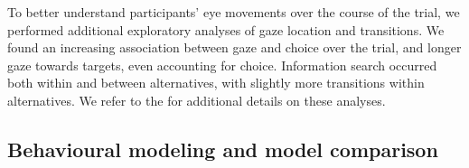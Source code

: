 \documentclass[11pt, a4paper]{article}
\begin{document}
To better understand participants' eye movements over the course of the trial, we performed additional exploratory analyses of gaze location and transitions. We found an increasing association between gaze and choice over the trial, and longer gaze towards targets, even accounting for choice. Information search occurred both within and between alternatives, with slightly more transitions within alternatives. We refer to the  for additional details on these analyses.

\subsection*{Behavioural modeling and model comparison}

\end{document}
